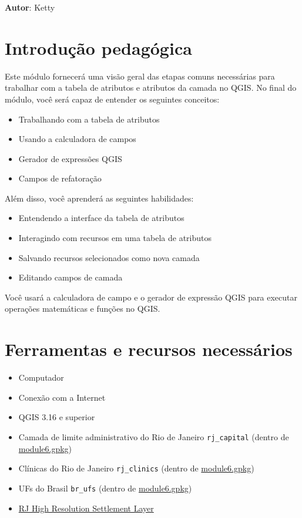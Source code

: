 \documentclass[
]{book}
\providecommand{\tightlist}{%
  \setlength{\itemsep}{0pt}\setlength{\parskip}{0pt}}
\begin{document}
\textbf{Autor}: Ketty

\hypertarget{introduuxe7uxe3o-pedaguxf3gica-6}{%
\section{Introdução pedagógica}\label{introduuxe7uxe3o-pedaguxf3gica-6}}

Este módulo fornecerá uma visão geral das etapas comuns necessárias para trabalhar com a tabela de atributos e atributos da camada no QGIS. No final do módulo, você será capaz de entender os seguintes conceitos:

\begin{itemize}
\tightlist
\item
  Trabalhando com a tabela de atributos
\item
  Usando a calculadora de campos
\item
  Gerador de expressões QGIS
\item
  Campos de refatoração
\end{itemize}

Além disso, você aprenderá as seguintes habilidades:

\begin{itemize}
\tightlist
\item
  Entendendo a interface da tabela de atributos
\item
  Interagindo com recursos em uma tabela de atributos
\item
  Salvando recursos selecionados como nova camada
\item
  Editando campos de camada
\end{itemize}

Você usará a calculadora de campo e o gerador de expressão QGIS para executar operações matemáticas e funções no QGIS.

\hypertarget{ferramentas-e-recursos-necessuxe1rios-6}{%
\section{Ferramentas e recursos necessários}\label{ferramentas-e-recursos-necessuxe1rios-6}}

\begin{itemize}
\tightlist
\item
  Computador
\item
  Conexão com a Internet
\item
  QGIS 3.16 e superior
\item
  Camada de limite administrativo do Rio de Janeiro \texttt{rj\_capital} (dentro de \href{data/module6.gpkg}{module6.gpkg})
\item
  Clínicas do Rio de Janeiro \texttt{rj\_clinics} (dentro de \href{data/module6.gpkg}{module6.gpkg})
\item
  UFs do Brasil \texttt{br\_ufs} (dentro de \href{data/module6.gpkg}{module6.gpkg})
\item
  \href{data/hrsl_rj_capital_populacao.tif}{RJ High Resolution Settlement Layer}
\end{itemize}
\end{document}

